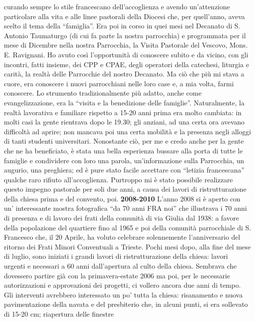 curando sempre lo stile francescano dell'accoglienza e avendo un'attenzione particolare alla vita e 
alle linee pastorali della Diocesi che, per quell'anno, aveva scelto il tema della “famiglia”.
Era poi in corso in quei mesi nel Decanato di S. Antonio Taumaturgo (di cui fa parte la nostra 
parrocchia) e programmata per il mese di Dicembre nella nostra Parrocchia, la Visita Pastorale del 
Vescovo, Mons. E. Ravignani.
Ho avuto così l'opportunità di conoscere subito e da vicino, con gli incontri, fatti insieme, dei CPP e 
CPAE, degli operatori della catechesi, liturgia e carità, la realtà delle Parrocchie del nostro 
Decanato. Ma ciò che più mi stava a cuore, era conoscere i nuovi parrocchiani nelle loro case e, a 
mia volta, farmi conoscere.
Lo strumento tradizionalmente più adatto, anche come evangelizzazione, era la “visita e la 
benedizione delle famiglie”. Naturalmente, la realtà lavorativa e familiare rispetto a 15-20 anni 
prima era molto cambiata: in molti casi la gente rientrava dopo le 19.30; gli anziani, ad una certa 
ora avevano difficoltà ad aprire; non mancava poi una certa mobilità e la presenza negli alloggi di 
tanti studenti universitari. 
Nonostante ciò, per me e credo anche per la gente che ne ha beneficiato, è stata una bella esperienza 
bussare alla porta di tutte le famiglie e condividere con loro una parola, un'informazione sulla 
Parrocchia, un augurio, una preghiera; ed è pure stato facile accettare con “letizia francescana” 
qualche raro rifiuto all'accoglienza. Purtroppo mi è stato possibile realizzare questo impegno 
pastorale per soli due anni, a causa dei lavori di ristrutturazione della chiesa prima e del convento, 
poi.
\bigbreak
\textbf{2008-2010}
\medbreak
L'anno 2008 si è aperto con un' interessante mostra fotografica “da 70 anni FRA noi” che 
illustrava i 70 anni di presenza e di lavoro dei frati della comunità di via Giulia dal 1938: a favore 
della popolazione del quartiere fino al 1965 e poi della comunità parrocchiale di S. Francesco che, il 
20 Aprile, ha voluto celebrare solennemente l'anniversario del ritorno dei Frati Minori Conventuali 
a Trieste.
Pochi mesi dopo, alla fine del mese di luglio, sono iniziati i grandi lavori di ristrutturazione della 
chiesa: lavori urgenti e necessari a 60 anni dall'apertura al culto della chiesa.
Sembrava che dovessero partire già con la primavera-estate 2006 ma poi, per le necessarie 
autorizzazioni e approvazioni dei progetti, ci vollero ancora due anni di tempo.
Gli interventi avrebbero interessato un po' tutta la chiesa: risanamento e nuova pavimentazione della 
navata e del presbiterio che, in alcuni punti, si era sollevato di 15-20 cm; riapertura delle finestre 
